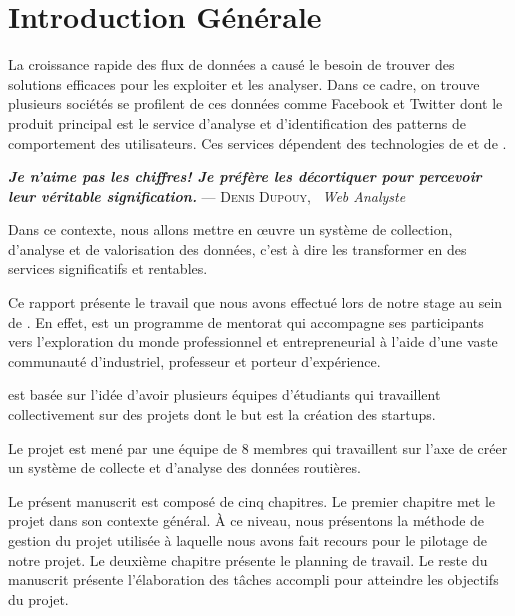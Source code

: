 \chapter*{Introduction Générale}

La croissance rapide des flux de données a causé le
besoin de trouver des solutions efficaces pour les exploiter et les analyser.
Dans ce cadre, on trouve plusieurs sociétés se profilent de ces données comme
Facebook et Twitter dont le produit principal est le service d'analyse et
d'identification des patterns de comportement des utilisateurs. Ces services
dépendent des technologies de  et de .


\begin{center}
\textbf{\textit{Je n’aime pas les chiffres! Je préfère les décortiquer pour
percevoir leur véritable signification.}} \linebreak
\hfill --- \textsc{Denis Dupouy}, \ \textit{Web Analyste}
\end{center}

Dans ce contexte, nous allons mettre en \oe{}uvre un système de collection,
d'analyse et de valorisation des données, c'est à dire les transformer en des
services significatifs et rentables.

Ce rapport présente le travail que nous avons effectué lors de notre stage au
sein de . En effet,  est
un programme de mentorat qui accompagne ses participants vers l'exploration du
monde professionnel et entrepreneurial à l'aide d'une vaste communauté
d'industriel, professeur et porteur d'expérience.

 est basée sur l'idée d'avoir plusieurs équipes
d'étudiants qui travaillent collectivement sur des projets dont le but est la
création des startups.

Le projet  est mené par une équipe de 8 membres qui travaillent
sur l'axe de créer un système de collecte et
d'analyse des données routières.

Le présent manuscrit est composé de cinq chapitres. Le premier chapitre met le
projet dans son contexte général. À ce niveau, nous présentons la méthode de
gestion du projet utilisée à laquelle nous avons fait recours pour le pilotage
de notre projet. Le deuxième chapitre présente le planning de travail.  Le
reste du manuscrit présente l'élaboration des tâches accompli pour atteindre
les objectifs du projet.
